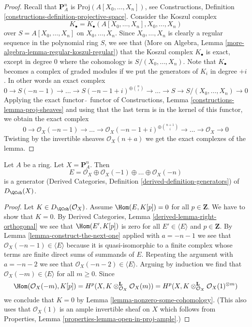 \begin{proof}
Recall that $\mathbf{P}^n_A$ is $\text{Proj}(A[X_0, \ldots, X_n])$, see
Constructions, Definition \ref{constructions-definition-projective-space}.
Consider the Koszul complex
$$
K_\bullet = K_\bullet(A[X_0, \ldots, X_n], X_0, \ldots, X_n)
$$
over $S = A[X_0, \ldots, X_n]$ on $X_0, \ldots, X_n$.
Since $X_0, \ldots, X_n$ is clearly a regular sequence in the
polynomial ring $S$, we see that
(More on Algebra, Lemma \ref{more-algebra-lemma-regular-koszul-regular})
that the Koszul complex $K_\bullet$ is exact, except in degree $0$
where the cohomology is $S/(X_0, \ldots, X_n)$.
Note that $K_\bullet$ becomes a complex of graded modules if we
put the generators of $K_i$ in degree $+i$. In other words an
exact complex
$$
0 \to S(-n - 1) \to \ldots \to S(-n - 1 + i)^{\oplus {n \choose i}} \to \ldots
\to S \to S/(X_0, \ldots, X_n) \to 0
$$
Applying the exact functor $\tilde{\ }$ functor of Constructions, 
Lemma \ref{constructions-lemma-proj-sheaves} and using that
the last term is in the kernel of this functor,
we obtain the exact complex
$$
0 \to \mathcal{O}_X(-n - 1) \to \ldots
\to \mathcal{O}_X(-n - 1 + i)^{\oplus {n + 1 \choose i}} \to
\ldots \to \mathcal{O}_X \to 0
$$
Twisting by the invertible sheaves $\mathcal{O}_X(n + a)$
we get the exact complexes of the lemma.
\end{proof}

\begin{lemma}
\label{lemma-generator-P1}
Let $A$ be a ring. Let $X = \mathbf{P}^n_A$. Then
$$
E =
\mathcal{O}_X \oplus \mathcal{O}_X(-1) \oplus \ldots \oplus \mathcal{O}_X(-n)
$$
is a generator
(Derived Categories, Definition \ref{derived-definition-generators})
of $D_\QCoh(X)$.
\end{lemma}

\begin{proof}
Let $K \in D_\QCoh(\mathcal{O}_X)$. Assume
$\Hom(E, K[p]) = 0$ for all $p \in \mathbf{Z}$.
We have to show that $K = 0$.
By Derived Categories, Lemma
\ref{derived-lemma-right-orthogonal}
we see that $\Hom(E', K[p])$ is zero for all $E' \in \langle E \rangle$
and $p \in \mathbf{Z}$.
By Lemma \ref{lemma-construct-the-next-one}
applied with $a = -n - 1$
we see that $\mathcal{O}_X(-n - 1) \in \langle E \rangle$
because it is quasi-isomorphic to a finite complex
whose terms are finite direct sums of summands of $E$.
Repeating the argument with $a = -n - 2$ we see that
$\mathcal{O}_X(-n - 2) \in \langle E \rangle$.
Arguing by induction we find that $\mathcal{O}_X(-m) \in \langle E \rangle$
for all $m \geq 0$.
Since
$$
\Hom(\mathcal{O}_X(-m), K[p]) =
H^p(X, K \otimes_{\mathcal{O}_X}^\mathbf{L} \mathcal{O}_X(m)) =
H^p(X, K \otimes_{\mathcal{O}_X}^\mathbf{L} \mathcal{O}_X(1)^{\otimes m})
$$
we conclude that $K = 0$ by Lemma \ref{lemma-nonzero-some-cohomology}.
(This also uses that $\mathcal{O}_X(1)$ is an ample
invertible sheaf on $X$ which follows from
Properties, Lemma \ref{properties-lemma-open-in-proj-ample}.)
\end{proof}

